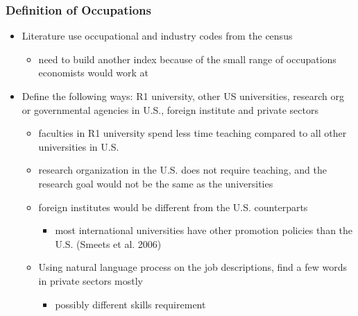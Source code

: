 \documentclass[11pt]{beamer}
\begin{document}
\begin{frame}[label=Occupation]
	\frametitle{Definition of Occupations}
	\begin{itemize}
		\item Literature use occupational and industry codes from the census
		\begin{itemize}
			\item  need to build another index because of the small range of occupations economists would work at
		\end{itemize}
		\item Define the following ways: R1 university, other US universities, research org or governmental agencies in U.S., foreign institute and private sectors
		\begin{itemize}
			\item faculties in R1 university spend less time teaching compared to all other universities in U.S.  \hyperlink{teaching}{}
			\item research organization in the U.S. does not require teaching, and the research goal would not be the same as the universities
			\item foreign institutes would be different from the U.S. counterparts
			\begin{itemize}
				\item most international universities have other promotion policies than the U.S. (Smeets et al. 2006)
			\end{itemize}
			\item Using natural language process on the job descriptions, find a few words in private sectors mostly  \hyperlink{NLP}{}
				\begin{itemize}
					\item possibly different skills requirement
				\end{itemize}
		\end{itemize}
	\end{itemize}
\end{frame}
\end{document}
